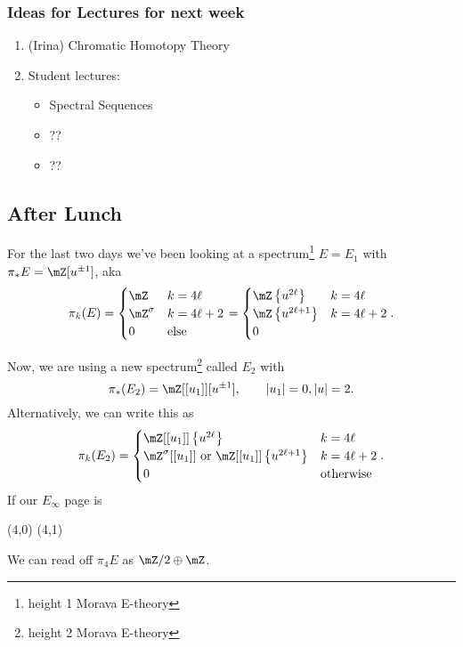 \subsubsection{Ideas for Lectures for next week}
\begin{enumerate}
    \item (Irina) Chromatic Homotopy Theory
    \item Student lectures: 
    \begin{itemize}
        \item Spectral Sequences
        \item ??
        \item ??
    \end{itemize}
\end{enumerate}
\newpage
\subsection{After Lunch}

For the last two days we've been looking at a spectrum\footnote{height 1 Morava E-theory} $E = E_1$ with $\pi_\ast E = \mZ[u^{\pm 1}]$, aka $$\pi_k(E) = \begin{cases}
    \mZ & k = 4\ell\\
    \mZ^\sigma & k = 4\ell+2\\
    0 & \text{else}
\end{cases} = \begin{cases}
    \mZ\sets{u^{2\ell}} & k = 4\ell\\
    \mZ\sets{u^{2\ell+1}} & k = 4\ell + 2\\
    0
\end{cases}.$$

Now, we are using a new spectrum\footnote{height 2 Morava E-theory} called $E_2$ with $$\pi_\ast(E_2) = \mZ[[u_1]][u^{\pm 1}],\qquad \abs{u_1} = 0,\abs{u}=2.$$ Alternatively, we can write this as $$\pi_k(E_2) = \begin{cases}
    \mZ[[u_1]]\sets{u^{2\ell}} & k = 4\ell\\
    \mZ^\sigma[[u_1]]\text{ or }\mZ[[u_1]]\sets{u^{2\ell+1}} & k = 4\ell+2\\
    0 & \text{otherwise}
\end{cases}.$$
If our $E_\infty$ page is
\begin{sseqdata}[name = w1d5ex1,Adams grading,classes = {draw = none}]
    \class["\mZ/2"] (4,0)
    \class["\mZ"] (4,1)
\end{sseqdata}
\begin{center}
    \printpage[name = w1d5ex1,grid = chess, x range = {0}{6},page = 0]
\end{center}
We can read off $\pi_4E$ as $\mZ/2\oplus \mZ$. 
